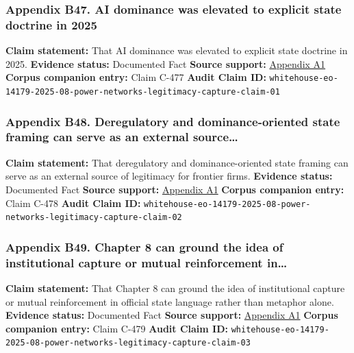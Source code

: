 \documentclass[
  american,
  11pt,
  letterpaper,
]{article}
\begin{document}
\subsubsection{Appendix B47. AI dominance was elevated to explicit state
doctrine in
2025}\label{appendix-b47-ai-dominance-was-elevated-to-explicit-state-doctrine-in-2025}

\textbf{Claim statement:} That AI dominance was elevated to explicit
state doctrine in 2025. \textbf{Evidence status:} Documented Fact
\textbf{Source support:}
\hyperref[appendix-a1-removing-barriers-to-american-leadership-in-artificial-intelligence]{Appendix
A1} \textbf{Corpus companion entry:} Claim C-477 \textbf{Audit Claim
ID:}
\texttt{whitehouse-eo-14179-2025-08-power-networks-legitimacy-capture-claim-01}

\subsubsection{Appendix B48. Deregulatory and dominance-oriented state
framing can serve as an external
source\ldots{}}\label{appendix-b48-deregulatory-and-dominance-oriented-state-framing-can-serve-as-an-external-source}

\textbf{Claim statement:} That deregulatory and dominance-oriented state
framing can serve as an external source of legitimacy for frontier
firms. \textbf{Evidence status:} Documented Fact \textbf{Source
support:}
\hyperref[appendix-a1-removing-barriers-to-american-leadership-in-artificial-intelligence]{Appendix
A1} \textbf{Corpus companion entry:} Claim C-478 \textbf{Audit Claim
ID:}
\texttt{whitehouse-eo-14179-2025-08-power-networks-legitimacy-capture-claim-02}

\subsubsection{Appendix B49. Chapter 8 can ground the idea of
institutional capture or mutual reinforcement
in\ldots{}}\label{appendix-b49-chapter-8-can-ground-the-idea-of-institutional-capture-or-mutual-reinforcement-in}

\textbf{Claim statement:} That Chapter 8 can ground the idea of
institutional capture or mutual reinforcement in official state language
rather than metaphor alone. \textbf{Evidence status:} Documented Fact
\textbf{Source support:}
\hyperref[appendix-a1-removing-barriers-to-american-leadership-in-artificial-intelligence]{Appendix
A1} \textbf{Corpus companion entry:} Claim C-479 \textbf{Audit Claim
ID:}
\texttt{whitehouse-eo-14179-2025-08-power-networks-legitimacy-capture-claim-03}
\end{document}

